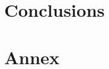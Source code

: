 \documentclass[11pt]{article}
\begin{document}
\section*{Conclusions}
\section*{Annex}
\end{document}
